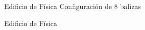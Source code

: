 \documentclass{beamer}
\begin{document}
  \begin{frame}{Edificio de Física}
    Configuración de 8 balizas
    \begin{figure}[H]
      \centering
      \def\svgwidth{0.5\linewidth}
       
      \label{fig:sensores_fisica_8}
    \end{figure}
  \end{frame}

  \begin{frame}{Edificio de Física}
    \begin{figure}[H]
      \centering
      \scalebox{0.6}{}
      \label{fig:res_fisica_8}
  \end{figure}
  \end{frame}
\end{document}
